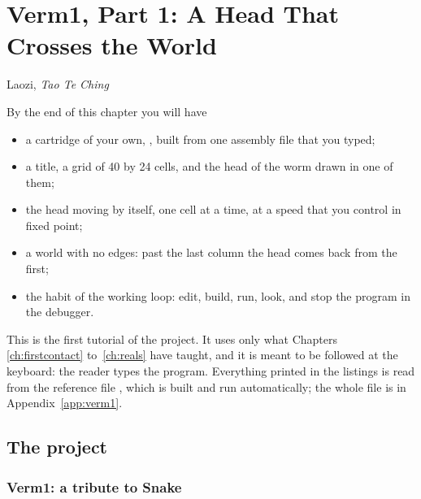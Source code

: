 \chapter{Verm1, Part 1: A Head That Crosses the World}
\label{ch:verm1p1}

  {Laozi, \emph{Tao Te Ching}}

\begin{chapgoals}
By the end of this chapter you will have
\begin{itemize}
\item a cartridge of your own, , built from one assembly
  file that you typed;
\item a title, a grid of 40 by 24 cells, and the head of the worm drawn in one of them;
\item the head moving by itself, one cell at a time, at a speed that you control in fixed point;
\item a world with no edges: past the last column the head comes back from the first;
\item the habit of the working loop: edit, build, run, look, and stop the
  program in the debugger.
\end{itemize}
\end{chapgoals}


This is the first tutorial of the project. It uses only what Chapters
\ref{ch:firstcontact} to~\ref{ch:reals} have taught, and it is meant to be
followed at the keyboard: the reader types the program. Everything printed in
the listings is read from the reference file , which is
built and run automatically; the whole file is in Appendix~\ref{app:verm1}.

\section{The project}

\subsection{Verm1: a tribute to Snake}

